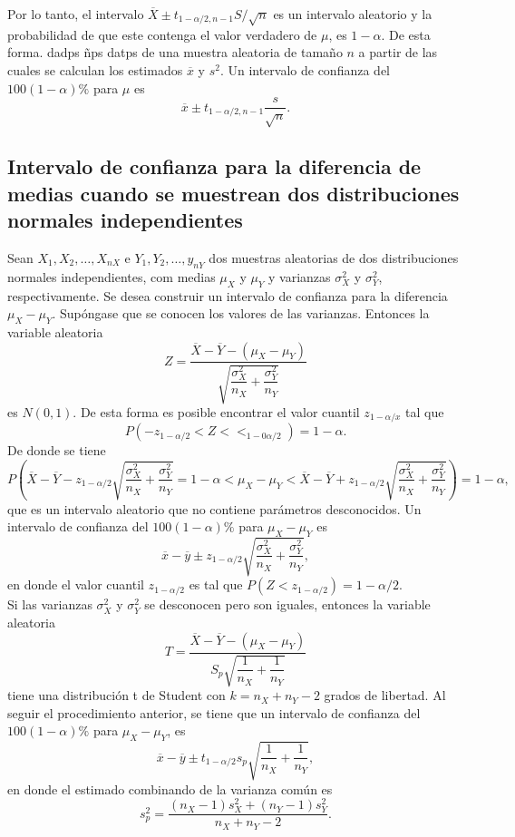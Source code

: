 Por lo tanto, el intervalo $\overline{X}\pm t_{1-\alpha/2,n-1}S/\sqrt{n}$ es un intervalo aleatorio  y la probabilidad de que este contenga el valor verdadero de $\mu$, es $1-\alpha$. De esta forma. dadps ñps datps de una muestra aleatoria de tamaño $n$ a partir de las cuales se calculan los estimados $\overline{x}$ y $s^2$. Un intervalo de confianza del $100(1-\alpha)\%$ para $\mu$ es
$$\overline{x}\pm t_{1-\alpha/2,n-1}\dfrac{s}{\sqrt{n}}.$$


\subsection{Intervalo de confianza para la diferencia de medias cuando se muestrean dos distribuciones normales independientes}

Sean $X_1,X_2,\ldots,X_{nX}$ e $Y_1,Y_2,\ldots,y_{nY}$ dos muestras aleatorias de dos distribuciones normales independientes, com medias $\mu_X$ y $\mu_Y$ y varianzas $\sigma_X^2$ y $\sigma_Y^2$, respectivamente. Se desea construir un intervalo de confianza para la diferencia $\mu_X-\mu_Y$. Supóngase que se conocen los valores de las varianzas. Entonces la variable aleatoria
$$Z=\dfrac{\overline{X}-\overline{Y}-(\mu_X-\mu_Y)}{\sqrt{\dfrac{\sigma_X^2}{n_X}+\dfrac{\sigma_Y^2}{n_Y}}}$$
es $N(0,1)$. De esta forma es posible encontrar el valor cuantil $z_{1-\alpha/x}$ tal que
$$P(-z_{1-\alpha/2}<Z<<_{1-0\alpha/2})=1-\alpha.$$
De donde se tiene
$$P\left(\overline{X}-\overline{Y}-z_{1-\alpha/2}\sqrt{\dfrac{\sigma_X^2}{n_X}+\dfrac{\sigma_Y^2}{n_Y}}=1-\alpha<\mu_X-\mu_Y<\overline{X}-\overline{Y}+z_{1-\alpha/2}\sqrt{\dfrac{\sigma_X^2}{n_X}+\dfrac{\sigma_Y^2}{n_Y}}\right)=1-\alpha,$$
que es un intervalo aleatorio que no contiene parámetros desconocidos. Un intervalo de confianza del $100(1-\alpha)\%$ para $\mu_X-\mu_Y$ es
$$\overline{x}-\overline{y}\pm z_{1-\alpha/2}\sqrt{\dfrac{\sigma_X^2}{n_X}+\dfrac{\sigma_Y^2}{n_Y}},$$
en donde el valor cuantil $z_{1-\alpha/2}$ es tal que $P(Z<z_{1-\alpha/2})=1-\alpha/2$.\\

Si las varianzas $\sigma_X^2$ y $\sigma_Y^2$ se desconocen pero son iguales, entonces la variable aleatoria
$$T=\dfrac{\overline{X}-\overline{Y}-(\mu_X-\mu_Y)}{S_p\sqrt{\dfrac{1}{n_X}+\dfrac{1}{n_Y}}}$$
tiene una distribución t de Student con $k=n_X+n_Y-2$ grados de libertad. Al seguir el procedimiento anterior, se tiene que un intervalo de confianza del $100(1-\alpha)\%$ para $\mu_X-\mu_Y$, es 
$$\overline{x}-\overline{y}\pm t_{1-\alpha/2}s_p\sqrt{\dfrac{1}{n_X}+\dfrac{1}{n_Y}},$$
en donde el estimado combinando de la varianza común es
$$s_p^2 = \dfrac{(n_X-1)s_X^2+(n_Y-1)s_Y^2}{n_X+n_Y-2}.$$


